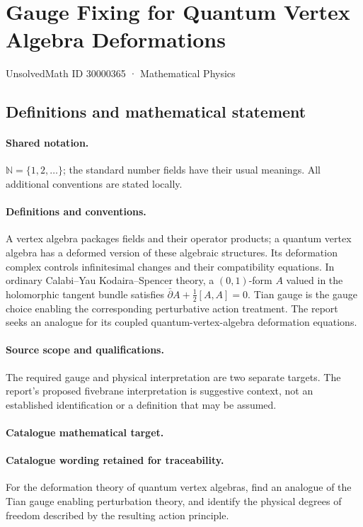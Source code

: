 \documentclass[11pt]{article}
\begin{document}
\setcounter{section}{30000364}
\section{Gauge Fixing for Quantum Vertex Algebra Deformations}\label{30000365}
{\small UnsolvedMath ID 30000365 · Mathematical Physics}
\subsection{Definitions and mathematical statement}

\paragraph{Shared notation.}$\mathbb N=\{1,2,\ldots\}$; the standard number fields have their usual meanings. All additional conventions are stated locally.


\paragraph{Definitions and conventions.} A vertex algebra packages fields and their operator products; a quantum vertex algebra has a deformed version of these algebraic structures. Its deformation complex controls infinitesimal changes and their compatibility equations. In ordinary Calabi--Yau Kodaira--Spencer theory, a $(0,1)$-form $A$ valued in the holomorphic tangent bundle satisfies $\bar\partial A+\tfrac12[A,A]=0$. Tian gauge is the gauge choice enabling the corresponding perturbative action treatment. The report seeks an analogue for its coupled quantum-vertex-algebra deformation equations.

\paragraph{Source scope and qualifications.} The required gauge and physical interpretation are two separate targets. The report's proposed fivebrane interpretation is suggestive context, not an established identification or a definition that may be assumed.

\paragraph{Catalogue mathematical target.}
\paragraph{Catalogue wording retained for traceability.}
For the deformation theory of quantum vertex algebras, find an analogue of the Tian gauge enabling perturbation theory, and identify the physical degrees of freedom described by the resulting action principle.
\end{document}

